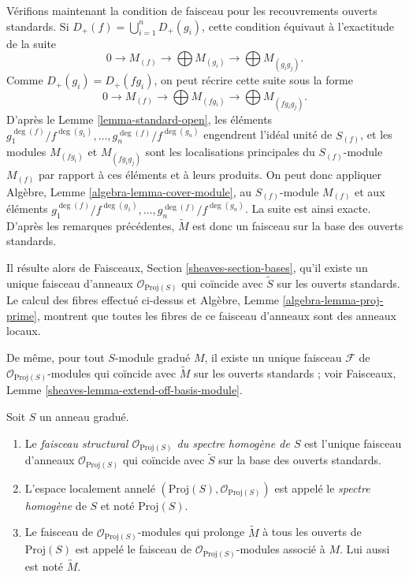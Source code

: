 \medskip\noindent
Vérifions maintenant la condition de faisceau pour les recouvrements ouverts
standards. Si
$D_{+}(f) = \bigcup_{i = 1}^n D_{+}(g_i)$, cette condition équivaut à
l'exactitude de la suite
$$
0 \to M_{(f)} \to \bigoplus M_{(g_i)} \to \bigoplus M_{(g_ig_j)}.
$$
Comme $D_{+}(g_i) = D_{+}(fg_i)$, on peut récrire cette suite sous la forme
$$
0 \to M_{(f)} \to \bigoplus M_{(fg_i)} \to \bigoplus M_{(fg_ig_j)}.
$$
D'après le Lemme \ref{lemma-standard-open}, les éléments
$g_1^{\deg(f)}/f^{\deg(g_1)}, \ldots, g_n^{\deg(f)}/f^{\deg(g_n)}$
engendrent l'idéal unité de $S_{(f)}$, et les modules
$M_{(fg_i)}$ et $M_{(fg_ig_j)}$ sont les localisations principales du
$S_{(f)}$-module $M_{(f)}$ par rapport à ces éléments et à leurs produits.
On peut donc appliquer Algèbre, Lemme \ref{algebra-lemma-cover-module}, au
$S_{(f)}$-module $M_{(f)}$ et aux éléments
$g_1^{\deg(f)}/f^{\deg(g_1)}, \ldots, g_n^{\deg(f)}/f^{\deg(g_n)}$.
La suite est ainsi exacte. D'après les remarques précédentes,
$\widetilde M$ est donc un faisceau sur la base des ouverts standards.

\medskip\noindent
Il résulte alors de Faisceaux, Section \ref{sheaves-section-bases}, qu'il
existe un unique faisceau d'anneaux $\mathcal{O}_{\text{Proj}(S)}$ qui coïncide
avec $\widetilde S$ sur les ouverts standards. Le calcul des fibres effectué
ci-dessus et Algèbre, Lemme \ref{algebra-lemma-proj-prime}, montrent que toutes
les fibres de ce faisceau d'anneaux sont des anneaux locaux.

\medskip\noindent
De même, pour tout $S$-module gradué $M$, il existe un unique faisceau
$\mathcal{F}$ de $\mathcal{O}_{\text{Proj}(S)}$-modules qui coïncide avec
$\widetilde M$ sur les ouverts standards ; voir Faisceaux,
Lemme \ref{sheaves-lemma-extend-off-basis-module}.

\begin{definition}
\label{definition-structure-sheaf}
Soit $S$ un anneau gradué.
\begin{enumerate}
\item Le {\it faisceau structural $\mathcal{O}_{\text{Proj}(S)}$ du spectre
homogène de $S$} est l'unique faisceau d'anneaux
$\mathcal{O}_{\text{Proj}(S)}$ qui coïncide avec $\widetilde S$ sur la base
des ouverts standards.
\item L'espace localement annelé
$(\text{Proj}(S), \mathcal{O}_{\text{Proj}(S)})$ est appelé le
{\it spectre homogène} de $S$ et noté $\text{Proj}(S)$.
\item Le faisceau de $\mathcal{O}_{\text{Proj}(S)}$-modules qui prolonge
$\widetilde M$ à tous les ouverts de $\text{Proj}(S)$ est appelé le faisceau
de $\mathcal{O}_{\text{Proj}(S)}$-modules associé à $M$. Lui aussi est noté
$\widetilde M$.
\end{enumerate}
\end{definition}

